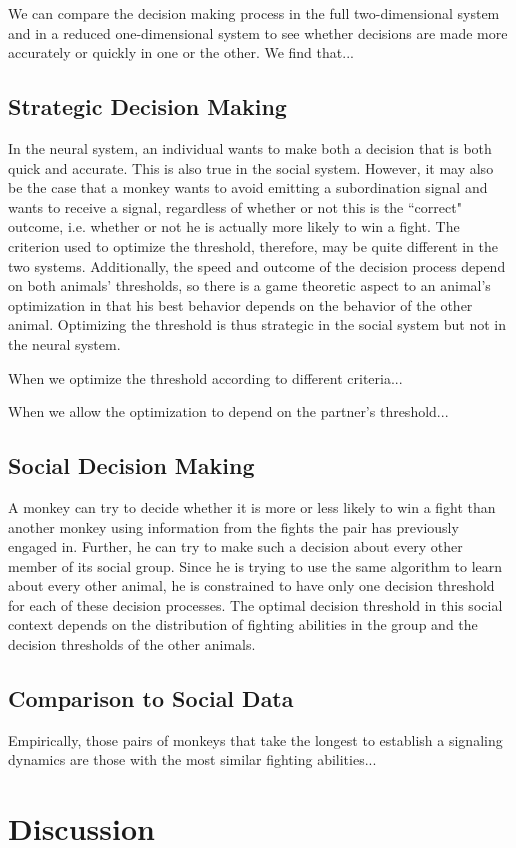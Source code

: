 \documentclass{article}
\begin{document}
We can compare the decision making process in the full two-dimensional system and in a reduced one-dimensional system to see whether decisions are made more accurately or quickly in one or the other. We find that...

\subsection{Strategic Decision Making }
In the neural system, an individual wants to make both a decision that is both quick and accurate.  This is also true in the social system.  However, it may also be the case that a monkey wants to avoid emitting a subordination signal and wants to receive a signal, regardless of whether or not this is the ``correct" outcome, i.e. whether or not he is actually more likely to win a fight.  The criterion used to optimize the threshold, therefore, may be quite different in the two systems.  Additionally, the speed and outcome of the decision process depend on both animals' thresholds, so there is a game theoretic aspect to an animal's optimization in that his best behavior depends on the behavior of the other animal. Optimizing the threshold is thus strategic in the social system but not in the neural system.  

When we optimize the threshold according to different criteria...

When we allow the optimization to depend on the partner's threshold...


\subsection{Social Decision Making }
A monkey can try to decide whether it is more or less likely to win a fight than another monkey using information from the fights the pair has previously engaged in.  Further, he can try to make such a decision about every other member of its social group.  Since he is trying to use the same algorithm to learn about every other animal, he is constrained to have only one decision threshold for each of these decision processes.  The optimal decision threshold in this social context depends on the distribution of fighting abilities in the group and the decision thresholds of the other animals. 

\subsection{Comparison to Social Data }
Empirically, those pairs of monkeys that take the longest to establish a signaling dynamics are those with the most similar fighting abilities...

\section{Discussion}




\nocite{*}


\end{document}
